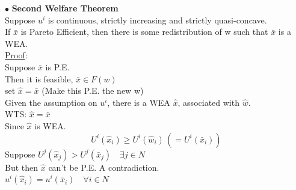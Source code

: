 \documentclass[letterpaper,13pt,single,pdftex]{scrartcl}
\begin{document}
$\bullet$ \textbf{Second Welfare Theorem}\\
Suppose $u^i$ is continuous, strictly increasing and strictly quasi-concave.\\
If $\bar{x}$ is Pareto Efficient, then there is some redistribution of w such that $\bar{x}$ is a WEA. \\
\underline{Proof}:\\
Suppose $\bar{x}$ is P.E. \\
Then it is feasible, $\bar{x} \in F(w)$\\
set $\hat{x} = \bar{x}$ (Make this P.E. the new w)\\
Given the assumption on $u^i$, there is a WEA $\hat{x}$, associated with $\hat{w}$.\\
WTS: $\hat{x} = \bar{x}$\\
Since $\hat{x}$ is WEA. 
\[U^i(\hat{x}_i) \ge U^i(\hat{w}_i)\, (=U^i(\bar{x}_i))\]
Suppose $U^j(\hat{x}_j) > U^j(\bar{x}_j)\quad \exists j \in N$\\
But then $\hat{x}$ can't be P.E. A contradiction. \\
$u^i(\hat{x}_i) = u^i(\bar{x}_i)\quad \forall i\in N$\\
\end{document}
